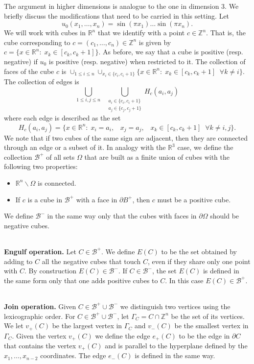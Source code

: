 \documentclass[11pt,reqno]{amsart}
\newcommand{\R}{{\mathbb R}}
\newcommand{\Z}{{\mathbb Z}}
\theoremstyle{definition}
\begin{document}
The argument in higher dimensions is analogue to the one in dimension 3. We briefly discuss the modifications that need to be carried in this setting. 
Let \[u_0(x_1, \dots, x_n)=\sin(\pi x_1) \dots \sin(\pi x_n).\]
We will work with cubes in $\R^n$ that we identify with a point  $c \in  \mathbb Z^n$. That is, the cube corresponding to $c=(c_1, \dots, c_n)\in \Z^n$ is given by
$c=\{x \in \R^n: \;x_k \in [c_k, c_k+1]\}$. 
As before, we say that a cube is positive (resp. negative) if $u_0$ is positive (resp. negative) when restricted to it. 
 The collection of  faces of the cube $c$ is 
 $\cup_{1 \leq i \leq n} \cup_{ x_i \in \{c_i, c_i+1\}} \{x \in \R^n:  \;x_k \in [c_k, c_k+1]\;\; \forall k \neq i\}$. 
 The collection of edges is \[ \bigcup_{1 \leq i,j \leq n}\;\; \bigcup_{\substack{a_i\in \{c_i, c_i+1\}\\ a_j\in \{c_j, c_j+1\}}} H_c(a_i,a_j)\]
where each edge is described as the set
\[H_c(a_i,a_j)=\{x \in \R^n:\; x_i=a_i, \;\;\; x_j=a_j,\; \;\;x_k \in [c_k, c_k+1] \;\; \forall k \neq i,j\}.\]
We note that if two cubes of the same sign are adjacent, then they are connected through an edge or a subset of it.
In analogy with the $\R^3$ case, we define the collection $\mathcal B^+$ of all sets $\Omega$ that are built as a finite union of cubes with the following two properties:
\begin{itemize}
\item  $\R^n \backslash \Omega$ is connected. 
\item If $c$ is a cube in  $ \mathcal B^+$ with a face in $\partial B^+$, then $c$ must be a positive cube. 
\end{itemize}
We define  $\mathcal B^-$ in the same way only that the cubes with faces in $\partial \Omega$ should be negative cubes.



\ \\{\bf Engulf operation.} Let $C \in \mathcal B^+$. We define $E(C)$ to be the set obtained by adding to $C$ all the negative cubes that touch $C$, even if they share only one point with $C$. By construction   $E(C) \in \mathcal B^-$.  
If $C \in \mathcal B^-$, the set $E(C)$ is defined in the same form only that one adds positive cubes to $C$. In this case $E(C) \in \mathcal B^+$.
 



\ \\{\bf Join operation.} Given $C \in \mathcal B^+ \cup \mathcal B^-$ we distinguish two vertices using the lexicographic order.  For  $C \in \mathcal B^+ \cup \mathcal B^-$, let $\Gamma_C= C \cap \Z^n$ be the set of its vertices. We let $v_+(C)$ be the largest vertex in $\Gamma_C$ and $v_-(C)$ be the smallest vertex in $\Gamma_C$.
Given the vertex $v_+(C)$ we define the edge $e_+(C)$ to be the edge in $\partial C$ that contains the vertex $v_+(C)$ and is parallel to the hyperplane defined by the $x_1, \dots, x_{n-2}$ coordinates. The edge $e_-(C)$ is defined in the same way.
\end{document}
